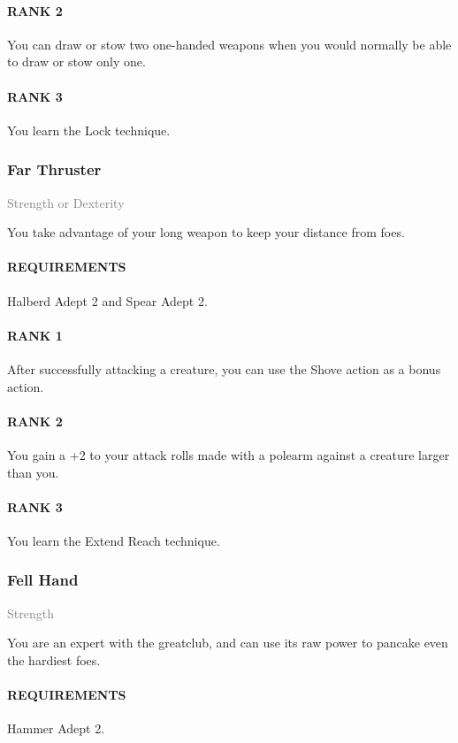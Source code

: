 \paragraph{RANK 2} You can draw or stow two one-handed weapons when you would normally be able to draw or stow only one.
\paragraph{RANK 3} You learn the Lock technique.

\subsubsection{Far Thruster} \label{feat::farthruster}
\small{\textcolor{gray}{Strength or Dexterity}}

\normalsize
You take advantage of your long weapon to keep your distance from foes.
\paragraph{REQUIREMENTS} Halberd Adept 2 and Spear Adept 2.
\paragraph{RANK 1} After successfully attacking a creature, you can use the Shove action as a bonus action.
\paragraph{RANK 2} You gain a +2 to your attack rolls made with a polearm against a creature larger than you.
\paragraph{RANK 3} You learn the Extend Reach technique.

\subsubsection{Fell Hand} \label{feat::fellhand}
\small{\textcolor{gray}{Strength}}

\normalsize
You are an expert with the greatclub, and can use its raw power to pancake even the hardiest foes.
\paragraph{REQUIREMENTS} Hammer Adept 2.
